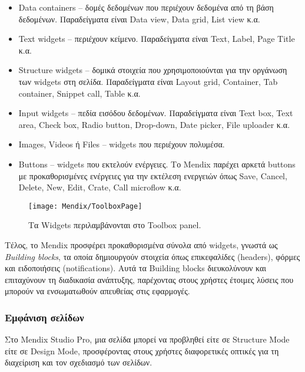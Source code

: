                \begin{itemize}[label={\tiny \blacksquare}]
                    \setlength\itemsep{-0.25em}
                    \item Data containers -- δομές δεδομένων που περιέχουν δεδομένα από τη βάση δεδομένων. Παραδείγματα είναι Data view, Data grid, List view κ.α.
                    \item Text widgets -- περιέχουν κείμενο. Παραδείγματα είναι Text, Label, Page Title κ.α.
                    \item Structure widgets -- δομικά στοιχεία που χρησιμοποιούνται για την οργάνωση των widgets στη σελίδα. Παραδείγματα είναι Layout grid, Container, Tab container, Snippet call, Table κ.α.
                    \item Input widgets -- πεδία εισόδου δεδομένων. Παραδείγματα είναι Text box, Text area, Check box, Radio button, Drop-down, Date picker, File uploader κ.α.
                    \item Images, Videos ή Files -- widgets που περιέχουν πολυμέσα.
                    \item Buttons -- widgets που εκτελούν ενέργειες. Το Mendix παρέχει αρκετά buttons με προκαθορισμένες ενέργειες για την εκτέλεση ενεργειών όπως Save, Cancel, Delete, New, Edit, Crate, Call microflow κ.α.
                \end{itemize}

            \begin{figure}[h!] \noindent \centering
                    \texttt{[image: Mendix/ToolboxPage]}
                    \caption{\centering Τα Widgets περιλαμβάνονται στο Toolbox panel.}
            \end{figure}

                Τέλος, το Mendix προσφέρει προκαθορισμένα σύνολα από widgets, γνωστά ως \textit{Building blocks}, τα οποία δημιουργούν στοιχεία όπως επικεφαλίδες (headers), φόρμες και ειδοποιήσεις (notifications). Αυτά τα Building blocks διευκολύνουν και επιταχύνουν τη διαδικασία ανάπτυξης, παρέχοντας στους χρήστες έτοιμες λύσεις που μπορούν να ενσωματωθούν απευθείας στις εφαρμογές.

        \subsubsection{Εμφάνιση σελίδων} \label{sec:MendixPageView}
            Στο Mendix Studio Pro, μια σελίδα μπορεί να προβληθεί είτε σε Structure Mode είτε σε Design Mode, προσφέροντας στους χρήστες διαφορετικές οπτικές για τη διαχείριση και τον σχεδιασμό των σελίδων.

